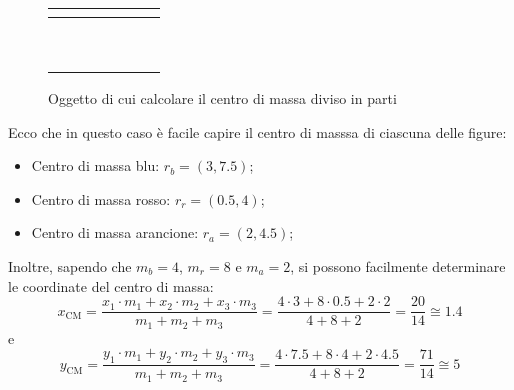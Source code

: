 \documentclass[a4paper]{extarticle}
\begin{document}
\begin{figure}[H]
  \centering
  \begin{tabular}{|c|c|c|c|c|c|c|}
    \hline
    $ $ & $ $ & $ $ & $ $ & $ $ & $ $ & $ $\\
    \hline
    $ $ & \cellcolor{red!25}$ $ & \cellcolor{blue!25}$ $ & \cellcolor{blue!25}$ $ & \cellcolor{blue!25}$ $ & \cellcolor{blue!25}$ $ & $ $\\
    \hline
    $ $ & \cellcolor{red!25}$ $ & $ $ & $ $ & $ $ & $ $ & $ $\\
    \hline
    $ $ & \cellcolor{red!25}$ $ & $ $ & $ $ & $ $ & $ $ & $ $\\
    \hline
    $ $ & \cellcolor{red!25}$ $ & \cellcolor{orange!25}$ $ & \cellcolor{orange!25}$ $ & $ $ & $ $ & $ $\\
    \hline
    $ $ & \cellcolor{red!25}$ $ & $ $ & $ $ & $ $ & $ $ & $ $\\
    \hline
    $ $ & \cellcolor{red!25}$ $ & $ $ & $ $ & $ $ & $ $ & $ $\\
    \hline
    $ $ & \cellcolor{red!25}$ $ & $ $ & $ $ & $ $ & $ $ & $ $\\
    \hline
    $ $ & \cellcolor{red!25}$ $ & $ $ & $ $ & $ $ & $ $ & $ $\\
    \hline
    $ $ & $ $ & $ $ & $ $ & $ $ & $ $ & $ $\\
    \hline
  \end{tabular}
  \caption{Oggetto di cui calcolare il centro di massa diviso in parti}
  \label{fig:calcolo_centro_massa_figura_divisa_parti}
\end{figure}

\vspace{1em}
\noindent
Ecco che in questo caso è facile capire il centro di masssa di ciascuna delle figure:
\begin{itemize}
  \item Centro di massa \textcolor{blue!25}{blu}: $r_b=(3,7.5)$;
  \item Centro di massa \textcolor{red!25}{rosso}: $r_r=(0.5,4)$;
  \item Centro di massa \textcolor{orange!25}{arancione}: $r_a=(2,4.5)$;
\end{itemize}
Inoltre, sapendo che $m_b=4$, $m_r=8$ e $m_a=2$, si possono facilmente determinare le coordinate del centro di massa:
\[x_{\text{CM}}=\frac{x_1 \cdot m_1 + x_2 \cdot m_2 + x_3 \cdot m_3}{m_1+m_2+m_3} = \frac{4 \cdot 3 + 8 \cdot 0.5 + 2 \cdot 2}{4+8+2}=\frac{20}{14}\cong 1.4\]
e
\[y_{\text{CM}}=\frac{y_1 \cdot m_1 + y_2 \cdot m_2 + y_3 \cdot m_3}{m_1+m_2+m_3} = \frac{4 \cdot 7.5 + 8 \cdot 4 + 2 \cdot 4.5}{4+8+2}=\frac{71}{14}\cong 5\]
\end{document}

